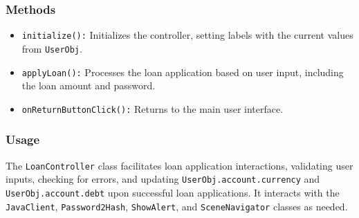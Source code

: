 \documentclass{article}
\begin{document}
\subsubsection{Methods}

\begin{itemize}
    \item \texttt{initialize():} Initializes the controller, setting labels with the current values from \texttt{UserObj}.
    \item \texttt{applyLoan():} Processes the loan application based on user input, including the loan amount and password.
    \item \texttt{onReturnButtonClick():} Returns to the main user interface.
\end{itemize}

\subsubsection{Usage}

The \texttt{LoanController} class facilitates loan application interactions, validating user inputs, checking for errors, and updating \texttt{UserObj.account.currency} and \texttt{UserObj.account.debt} upon successful loan applications. It interacts with the \texttt{JavaClient}, \texttt{Password2Hash}, \texttt{ShowAlert}, and \texttt{SceneNavigator} classes as needed.
\end{document}
